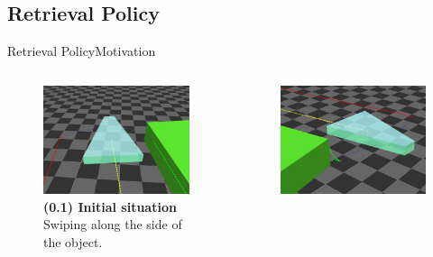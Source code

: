 \documentclass[AIRbeamer
,optEnglish
,optBiber
,optBibstyleAlphabetic
,optBeamerClassicFormat%
]{AIRlatex}
\begin{document}
    \subsection{Retrieval Policy}
    \begin{frame}[c]{Retrieval Policy}{Motivation}
        \begin{columns}[T,onlytextwidth]
            \begin{column}[T]{0.48\textwidth}
                \begin{figure}[H]
                    \centering
                    \captionsetup{justification=centering}
                    \includegraphics[width=\textwidth]{figures/retrieval/before}
                    \caption{\textbf{(0.1) Initial situation}\\Swiping along the side of the object.}
                \end{figure}
            \end{column}
            \begin{column}[T]{0.48\textwidth}
                \begin{figure}[H]
                    \centering
                    \captionsetup{justification=centering}
                    \includegraphics[width=\textwidth]{figures/retrieval/disengagement}

\end{figure}
\end{column}
\end{columns}
\end{frame}
\end{document}
